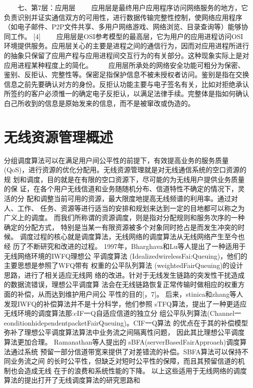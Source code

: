 　　七、第7层：应用层
　　应用层是最终用户应用程序访问网络服务的地方，它负责识别并证实通信双方的可用性，进行数据传输完整性控制，使网络应用程序（如电子邮件、P2P文件共享、多用户网络游戏、网络浏览、目录查询等）能够协同工作。  [4]
　　应用层是OSI参考模型的最高层，它为用户的应用进程访问OSI环境提供服务。应用层关心的主要是进程之间的通信行为，因而对应用进程所进行的抽象只保留了应用产程与应用进程间交互行为的有关部分。这种现象实际上是对应用进程某种程度上的简化。
　　应用层所承处的网络安全功能可粗分为保密、鉴别、反拒认、完整性等。保密足指保护信息不被未授权者访问。鉴别是指在交换信息之前先要确认对方的身份。反拒认功能主要与电子签名有关，比如对拒绝承认所签约的客户必须惟一的确定电子反拒认，以满足法律手续。完整体是指如何确认
白己所收到的信息是原始发来的信息，而不是被窜改或伪造的。
\section{无线资源管理概述}
分组调度算法可以在满足用户间公平性的前提下，有效提高业务的服务质量
(QoS)，进行资源的优化分配用。无线资源管理就是对无线通信系统的空口资源的规
划和调度，目的就是在有限的空口资源下，尽可能的为无线用户提供业务质量的保
证，在各个用户无线信道和业务随随机分布、信道特性不确定的情况下，灵活的分
配和调整当前可用的资源，最大限度地提高无线频谱的利用率。通过对人、工作、
任务、资源等进行适当的安排和规划来达到一定的目地都可以称之为广义上的调度。
而我们所称谓的资源调度，则是指对分配规则和服务次序的一种确定的分配方式，
特别是当某一有限资源被多个对象同时抢占是而发生冲突的时候。
调度过程的核心就是调度算法，无线网络的调度算法从无线网络产生至今也经
历了不断研究和改进的过程。
1997年，Bharghava和Lu等人提出了一种适用于无线网络环境的IWFQ理想公
平调度算法  (IdealizedwirelessFai:Queuing)，他们的主要思想是参照了WFQ带有
权重的公平队列算法  (weightedFairQueuing)的设计思路，进行了相关适应无线网
络的改进。针对于无线发生链路的突发性干扰造成的数据流错误，理想公平调度算
法会在无线链路恢复正常传输时做相应的权重方面的补偿，从而达到维护用户间公
平性的目的[，7]。
后来，stinica和zhang等人发现IWFQ的补偿算法并不是十分科学，他们参照
sTFQ算法，提出了一种更适应无线环境的调度算法那:cIF一Q自适应信道的独立分
组公平队列算法(Channel一    eonditionhidependentpacketFairQueuing)。CIF一Q算法
的优点在于其的补偿模型弥补了理想公平调度算法算法中业务流之间隔离性问题，
因此其比理想公平调度算法更加合理。
Ramanathan等人提出的   sBFA(serverBasedFairApproaeh)调度算法通过系统
预留一部分信道带宽来提供了对差错流的补偿。SBFA算法可以保持不同业务流之间
的长时公平性，但缺乏对短时公平性的保障，而且其预留信道的机制也会造成无线
在于的浪费和系统性能的下降。
以上这些适用于无线网络的调度算法的提出打开了无线调度算法的研究思路和
